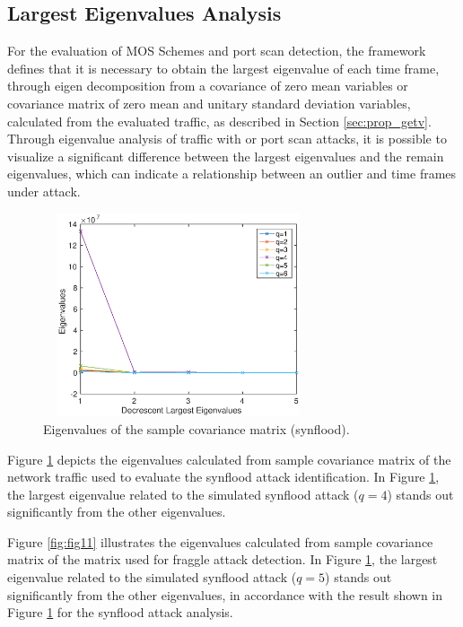 \documentclass[review]{elsarticle}
\providecommand{\DIFaddtex}[1]{{\protect\color{blue}\uwave{#1}}} %
\providecommand{\DIFaddbegin}{} %
\providecommand{\DIFaddend}{} %
\providecommand{\DIFadd}[1]{\texorpdfstring{\DIFaddtex{#1}}{#1}} %
\begin{document}
\subsection{Largest Eigenvalues Analysis}
\label{sec:largesteigenvaluesanalysis}

For the evaluation of MOS Schemes \DIFaddbegin \DIFadd{accuracy for flood }\DIFaddend and port scan detection, the framework defines that it is necessary to obtain the largest eigenvalue of each time frame, through eigen decomposition from a covariance of zero mean variables or covariance matrix of zero mean and unitary standard deviation variables, calculated from the evaluated traffic, as described in Section \ref{sec:prop_getv}. Through eigenvalue analysis of traffic with \DIFaddbegin \DIFadd{flood }\DIFaddend or port scan attacks, it is possible to visualize a significant difference between the largest eigenvalues and the remain eigenvalues, which can indicate a relationship between an outlier and time frames under attack.

\begin{figure}[h!]
	\centering
     \includegraphics[height=6cm, width=8cm]{results/figures/eigenvalues_synflood.eps} 
     \caption{Eigenvalues of the sample covariance matrix (synflood).}
     \label{fig:fig10}
\end{figure}

Figure \ref{fig:fig10} depicts the eigenvalues calculated from sample covariance matrix of the network traffic used to evaluate the synflood attack identification. In Figure \ref{fig:fig10}, the largest eigenvalue related to the simulated synflood attack ($q = 4$) stands out significantly from the other eigenvalues.

Figure \ref{fig:fig11} illustrates the eigenvalues calculated from sample covariance matrix of the matrix used for fraggle attack detection. In Figure \ref{fig:fig10}, the largest eigenvalue related to the simulated synflood attack ($q = 5$) stands out significantly from the other eigenvalues, in accordance with the result shown in Figure \ref{fig:fig10} for the synflood attack analysis.
\end{document}
